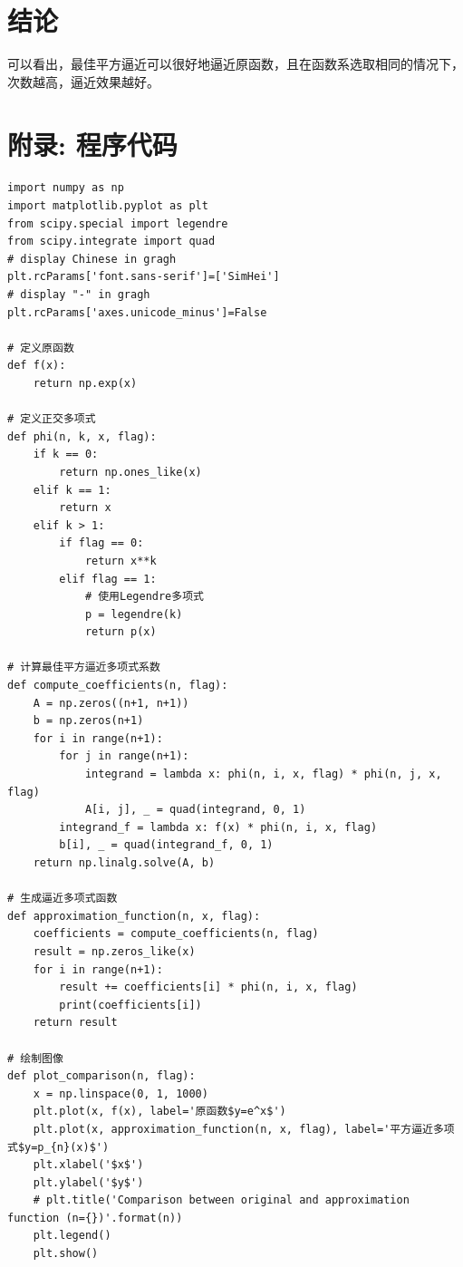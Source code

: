 \documentclass[UTF8,ctexart,a4paper,11pt,openany]{article}
\theoremstyle{definition}
\begin{document}
\section{结论}
可以看出，最佳平方逼近可以很好地逼近原函数，且在函数系选取相同的情况下，次数越高，逼近效果越好。
\clearpage

\section{附录: 程序代码}

\begin{lstlisting}[aboveskip=0pt]
import numpy as np
import matplotlib.pyplot as plt
from scipy.special import legendre
from scipy.integrate import quad
# display Chinese in gragh
plt.rcParams['font.sans-serif']=['SimHei']
# display "-" in gragh
plt.rcParams['axes.unicode_minus']=False

# 定义原函数
def f(x):
    return np.exp(x)

# 定义正交多项式
def phi(n, k, x, flag):
    if k == 0:
        return np.ones_like(x)
    elif k == 1:
        return x
    elif k > 1:
        if flag == 0:
            return x**k
        elif flag == 1:
            # 使用Legendre多项式
            p = legendre(k)
            return p(x)

# 计算最佳平方逼近多项式系数
def compute_coefficients(n, flag):
    A = np.zeros((n+1, n+1))
    b = np.zeros(n+1)
    for i in range(n+1):
        for j in range(n+1):
            integrand = lambda x: phi(n, i, x, flag) * phi(n, j, x, flag)
            A[i, j], _ = quad(integrand, 0, 1)
        integrand_f = lambda x: f(x) * phi(n, i, x, flag)
        b[i], _ = quad(integrand_f, 0, 1)
    return np.linalg.solve(A, b)

# 生成逼近多项式函数
def approximation_function(n, x, flag):
    coefficients = compute_coefficients(n, flag)
    result = np.zeros_like(x)
    for i in range(n+1):
        result += coefficients[i] * phi(n, i, x, flag)
        print(coefficients[i])
    return result

# 绘制图像
def plot_comparison(n, flag):
    x = np.linspace(0, 1, 1000)
    plt.plot(x, f(x), label='原函数$y=e^x$')
    plt.plot(x, approximation_function(n, x, flag), label='平方逼近多项式$y=p_{n}(x)$')
    plt.xlabel('$x$')
    plt.ylabel('$y$')
    # plt.title('Comparison between original and approximation function (n={})'.format(n))
    plt.legend()
    plt.show()


\end{lstlisting}
\end{document}

